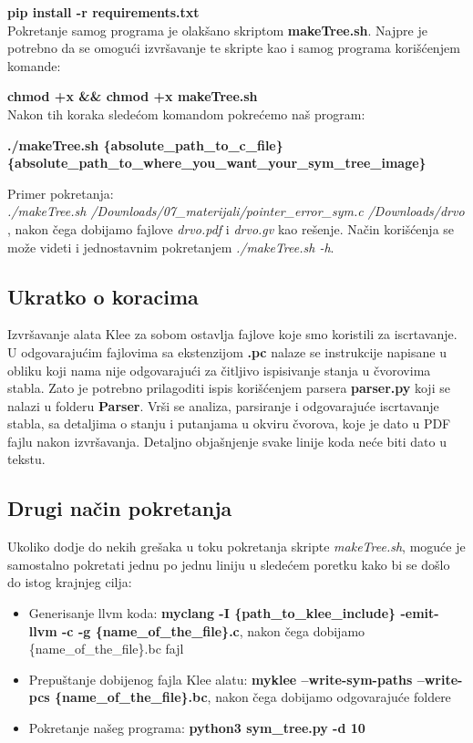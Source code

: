 \documentclass[a4paper]{article}
\begin{document}
\textbf{pip install -r requirements.txt} \\

Pokretanje samog programa je olakšano skriptom \textbf{makeTree.sh}. Najpre je potrebno da se omogući izvršavanje te skripte kao i samog programa korišćenjem komande:

\textbf{chmod +x \&\& chmod +x makeTree.sh} \\

Nakon tih koraka sledećom komandom pokrećemo naš program: 

\textbf{./makeTree.sh \{absolute\_path\_to\_c\_file\}\\ \{absolute\_path\_to\_where\_you\_want\_your\_sym\_tree\_image\} } 

Primer pokretanja:\\ \textit{./makeTree.sh /Downloads/07\_materijali/pointer\_error\_sym.c /Downloads/drvo }, nakon čega dobijamo fajlove \textit{drvo.pdf} i \textit{drvo.gv} kao rešenje. Način korišćenja se može videti i jednostavnim pokretanjem \textit{./makeTree.sh -h}.


\subsection{Ukratko o koracima}

Izvršavanje alata Klee za sobom ostavlja fajlove koje smo koristili za iscrtavanje. U odgovarajućim fajlovima sa ekstenzijom \textbf{.pc} nalaze se instrukcije napisane u obliku koji nama nije odgovarajući za čitljivo ispisivanje stanja u čvorovima stabla. Zato je potrebno prilagoditi ispis korišćenjem parsera \textbf{parser.py} koji se nalazi u folderu \textbf{Parser}. Vrši se analiza, parsiranje i odgovarajuće iscrtavanje stabla, sa detaljima o stanju i putanjama u okviru čvorova, koje je dato u PDF fajlu nakon izvršavanja. Detaljno objašnjenje svake linije koda neće biti dato u tekstu.

\subsection{Drugi način pokretanja}
Ukoliko dodje do nekih grešaka u toku pokretanja skripte \textit{makeTree.sh}, moguće je samostalno pokretati jednu po jednu liniju u sledećem poretku kako bi se došlo do istog krajnjeg cilja:\\

\begin{itemize}
    \item {Generisanje llvm koda: \textbf{myclang -I \{path\_to\_klee\_include\} -emit-llvm -c -g \{name\_of\_the\_file\}.c}, nakon čega dobijamo \{name\_of\_the\_file\}.bc fajl}
    
    \item {Prepuštanje dobijenog fajla Klee alatu: \textbf{myklee --write-sym-paths --write-pcs \{name\_of\_the\_file\}.bc}, nakon čega dobijamo odgovarajuće foldere}
    
    \item {Pokretanje našeg programa: \textbf{python3 sym\_tree.py -d 10}}
\end{itemize}
\end{document}
